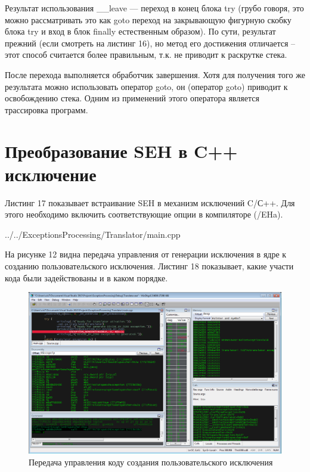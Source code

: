 \documentclass[a4paper, 12pt]{report}		%
\begin{document}
Результат использования \_\_leave — переход в конец блока try (грубо говоря, это можно рассматривать это как goto переход на закрывающую фигурную скобку блока try и вход в блок finally естественным образом). По сути, результат прежний (если смотреть на листинг 16), но метод его достижения отличается -- этот способ считается более правильным, т.к. не приводит к раскрутке стека.

После перехода выполняется обработчик завершения. Хотя для получения того же результата можно использовать оператор goto, он (оператор goto) приводит к освобождению стека. Одним из применений этого оператора является трассировка программ.


\chapter*{Преобразование SEH в C++ исключение}

Листинг 17 показывает встраивание SEH в механизм исключений C/С++. Для этого необходимо включить соответствующие опции в компиляторе (/EHa).


{../../ExceptionsProcessing/Translator/main.cpp}

На рисунке 12 видна передача управления от генерации исключения в ядре к созданию пользовательского исключения. Листинг 18 показывает, какие участи кода были задействованы и в каком порядке.

\begin{figure}[h!]
\centering
\includegraphics[scale=0.50]{res/012}
\caption{Передача управления коду создания пользовательского исключения}
\end{figure}
\end{document}
